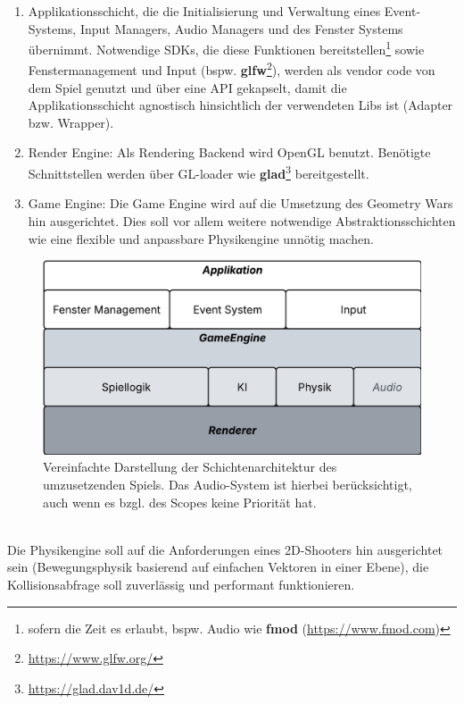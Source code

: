 \begin{enumerate}
    \item Applikationsschicht, die die Initialisierung und Verwaltung eines Event-Systems, Input Managers, Audio Managers und des Fenster Systems übernimmt. Notwendige SDKs, die diese Funktionen bereitstellen\footnote{
        sofern die Zeit es erlaubt, bspw. Audio wie \textbf{fmod} (\url{https://www.fmod.com})
    } sowie Fenstermanagement und Input (bspw. \textbf{glfw}\footnote{\url{https://www.glfw.org/}}), werden als vendor code von dem Spiel genutzt und über eine API gekapselt, damit die Applikationsschicht agnostisch hinsichtlich der verwendeten Libs ist (Adapter bzw. Wrapper).
    \item Render Engine: Als Rendering Backend wird OpenGL benutzt. Benötigte Schnittstellen werden über GL-loader wie \textbf{glad}\footnote{
        \url{https://glad.dav1d.de/}
    } bereitgestellt.
    \item Game Engine: Die Game Engine wird auf die Umsetzung des Geometry Wars hin ausgerichtet. Dies soll vor allem weitere notwendige Abstraktionsschichten wie eine flexible und anpassbare Physikengine unnötig machen.
\end{enumerate}

\begin{figure}
    \centering
    \includegraphics[width=1\columnwidth]{appendix/img/architecture}
    \caption{Vereinfachte Darstellung der Schichtenarchitektur des umzusetzenden Spiels. Das Audio-System ist hierbei berücksichtigt, auch wenn es bzgl. des Scopes keine Priorität hat.}
    \label{fig:architecture}
\end{figure}

\\


Die Physikengine soll auf die Anforderungen eines 2D-Shooters hin ausgerichtet sein (Bewegungsphysik basierend auf einfachen Vektoren in einer Ebene), die Kollisionsabfrage soll zuverlässig und performant funktionieren.


